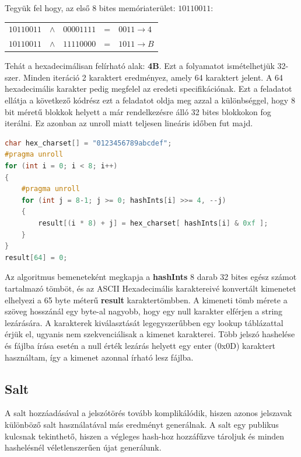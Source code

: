 Tegyük fel hogy, az első 8 bites memóriaterület: $10110011$:
%
\begin{table}[H]
    \centering
    \begin{tabular}{rcccl}
    
        $ 10110011 $ & $\land$ & $ 00001111 $ & = & $0011 \xrightarrow{} 4 $ \\
        $ 10110011 $ & $\land$ & $ 11110000 $ & = & $1011 \xrightarrow{} B $ \\
        
    \end{tabular}
\end{table}
%
Tehát a hexadecimálisan felírható alak: \textbf{4B}. Ezt a folyamatot ismételhetjük 32-szer. Minden iteráció 2 karaktert eredményez, amely 64 karaktert jelent. A 64 hexadecimális karakter pedig megfelel az eredeti specifikációnak. Ezt a feladatot ellátja a következő kódrész ezt a feladatot oldja meg azzal a különbséggel, hogy 8 bit méretű blokkok helyett a már rendelkezésre álló 32 bites blokkokon fog iterálni. Ez azonban az unroll miatt teljesen lineáris időben fut majd.


\begin{lstlisting}[language={C++}]
char hex_charset[] = "0123456789abcdef";
#pragma unroll
for (int i = 0; i < 8; i++)
{
    #pragma unroll
    for (int j = 8-1; j >= 0; hashInts[i] >>= 4, --j)
    {
        result[(i * 8) + j] = hex_charset[ hashInts[i] & 0xf ];
    }
}
result[64] = 0;
\end{lstlisting}


Az algoritmus bemeneteként megkapja a \textbf{hashInts} 8 darab 32 bites egész számot tartalmazó tömböt, és az ASCII Hexadecimális karaktereivé konvertált kimenetet elhelyezi a 65 byte méterű \textbf{result} karaktertömbben. A kimeneti tömb mérete a szöveg hosszánál egy byte-al nagyobb, hogy egy null karakter elférjen a string lezárására. A karakterek kiválasztását legegyszerűbben egy lookup táblázattal érjük el, ugyanis nem szekvenciálisak a kimenet karakterei. Több jelszó hashelése és fájlba írása esetén a null érték lezárás helyett egy enter (0x0D) karaktert használtam, így a kimenet azonnal írható lesz fájlba.


\subsection{Salt}

A salt hozzáadásával a jelszótörés tovább komplikálódik, hiszen azonos jelszavak különböző salt használatával más eredményt generálnak. A salt egy publikus kulcsnak tekinthető, hiszen a végleges hash-hoz hozzáfűzve tároljuk és minden hashelésnél véletlenszerűen újat generálunk.


